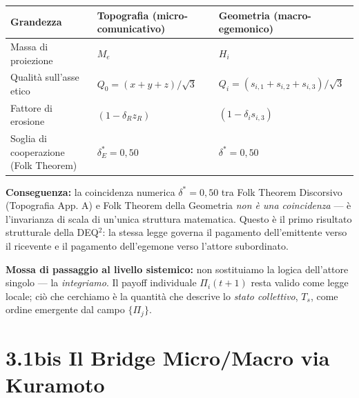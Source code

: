 {\def\LTcaptype{none} %
{\small\begin{longtable}[]{@{}
  >{\raggedright\arraybackslash}p{}
  >{\raggedright\arraybackslash}p{}
  >{\raggedright\arraybackslash}p{}@{}}
\toprule\noalign{}
\begin{minipage}[b]{\linewidth}\raggedright
Grandezza
\end{minipage} & \begin{minipage}[b]{\linewidth}\raggedright
Topografia (micro-comunicativo)
\end{minipage} & \begin{minipage}[b]{\linewidth}\raggedright
Geometria (macro-egemonico)
\end{minipage} \\
\midrule\noalign{}
\endhead
\bottomrule\noalign{}
\endlastfoot
Massa di proiezione & \(M_e\) & \(H_i\) \\
Qualità sull'asse etico & \(Q_0 = (x+y+z)/\sqrt{3}\) &
\(Q_i = (s_{i,1}+s_{i,2}+s_{i,3})/\sqrt{3}\) \\
Fattore di erosione & \((1 - \delta_R z_R)\) &
\((1 - \delta_i s_{i,3})\) \\
Soglia di cooperazione (Folk Theorem) & \(\delta^*_E = 0{,}50\) &
\(\delta^* = 0{,}50\) \\
\end{longtable}}
}

\Proved{} \textbf{Conseguenza:} la coincidenza numerica
\(\delta^* = 0{,}50\) tra Folk Theorem Discorsivo (Topografia App. A) e
Folk Theorem della Geometria \emph{non è una coincidenza} --- è
l'invarianza di scala di un'unica struttura matematica. Questo è il
primo risultato strutturale della DEQ$^2$: la stessa legge governa il
pagamento dell'emittente verso il ricevente e il pagamento dell'egemone
verso l'attore subordinato.

\Hypoth{} \textbf{Mossa di passaggio al livello sistemico:} non
sostituiamo la logica dell'attore singolo --- la \emph{integriamo}. Il
payoff individuale \(\Pi_i(t+1)\) resta valido come legge locale; ciò
che cerchiamo è la quantità che descrive lo \emph{stato collettivo},
\(T_s\), come ordine emergente dal campo \(\{\Pi_j\}\).



\section{3.1bis Il Bridge Micro/Macro via
Kuramoto}\label{bis-il-bridge-micromacro-via-kuramoto}

